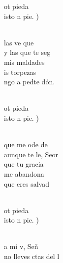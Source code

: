 \documentclass[12pt]{article}
\begin{document}
\begin{multicols*}{2}
\begin{cancion}%
	\begin{chorus}%
	ot pieda\\
	isto n pie. )\\
	\end{chorus}%
	\jump\\
	 las ve que  \\
	y las que te seg  \\
	 mis maldades\\
	is torpezas\\
	ngo a pedte dón.\\\jump\\
	\begin{chorus}%
	ot pieda\\
	isto n pie. )\\
	\end{chorus}%
	\jump\\
	que me ode de \\
	aunque te le, Seor\\
	 que tu gracia\\
	me abandona\\
	 que eres  salvad  \\\jump\\
	\begin{chorus}%
	ot pieda\\
	isto n pie. )\\
	\end{chorus}%
	\jump\\
	a mi v, Señ \\
	no lleves ctas del l \\

\end{cancion}
\end{multicols*}
\end{document}
